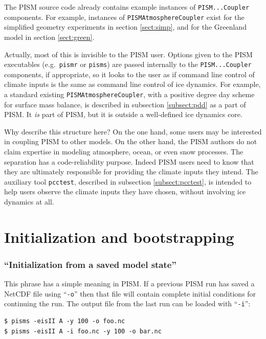 \documentclass[11pt,final]{amsart}
\renewcommand{\t}[1]{\texttt{#1}}
\newcommand{\pismoptionindex}[1]{\index{options for PISM (and PETSc)!\texttt{-#1}}}
\newcommand{\intextoption}[1]{\texttt{-#1}\pismoptionindex{#1}}
\begin{document}
The PISM source code already contains example instances of \t{PISM...Coupler} components.  For example, instances of \t{PISMAtmosphereCoupler} exist for the simplified geometry experiments in section \ref{sect:simp}, and for the Greenland model in section \ref{sect:green}.

Actually, most of this is invisible to the PISM user.  Options given to the PISM executables (e.g.~\t{pismr} or \t{pisms}) are passed internally to the \t{PISM...Coupler} components, if appropriate, so it looks to the user as if command line control of climate inputs is the same as command line control of ice dynamics.  For example, a standard existing \t{PISMAtmosphereCoupler}, with a positive degree day scheme for surface mass balance, is described in subsection \ref{subsect:pdd} as a part of PISM.  It \emph{is} part of PISM, but it is outside a well-defined ice dynamics core.

Why describe this structure here?  On the one hand, some users may be interested in coupling PISM to other models.  On the other hand, the PISM authors do not claim expertise in modeling atmosphere, ocean, or even snow processes.  The separation has a code-reliability purpose.  Indeed PISM users need to know that they are ultimately responsible for providing the climate inputs they intend.  The auxiliary tool \verb|pcctest|, described in subsection \ref{subsect:pcctest}, is intended to help users observe the climate inputs they have chosen, without involving ice dynamics at all.


\clearpage
\newpage
\section{Initialization and bootstrapping}\label{sect:boot}  

\subsubsection*{``Initialization from a saved model state''}  This phrase has a simple meaning in PISM.  If a previous PISM run has saved a NetCDF file using ``\verb|-o|'' then that file will contain complete initial conditions for continuing the run.  The output file from the last run can be loaded with ``\intextoption{i}'':

\begin{verbatim}
$ pisms -eisII A -y 100 -o foo.nc
$ pisms -eisII A -i foo.nc -y 100 -o bar.nc
\end{verbatim}
\smallskip
\end{document}
